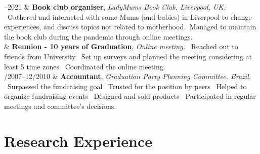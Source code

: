 \documentclass[11pt, a4paper]{article}
\newcommand{\Duration}[2]{\fontsize{10pt}{0}\selectfont #1--#2}
\newcommand{\Year}[1]{\fontsize{10pt}{0}\selectfont #1}
\begin{document}
\begin{EntriesTable}
	\Duration{2020}{2021}  &
	\textbf{Book club organiser},
	\newline
	\textit{ LadyMums Book Club, Liverpool, UK.}
	\newline
	\textbullet \ Gathered and interacted with some Mums (and babies) in Liverpool to change
	experiences, and discuss topics not related to motherhood
	\textbullet \ Managed to maintain the book club during the pandemic through
	online meetings.
	\\
	\Year{2020}  &
	\textbf{Reunion - 10 years of Graduation},
	\newline
	\textit{ Online meeting.}
	\newline
	\textbullet \ Reached out to friends from University
	\textbullet \ Set up surveys and planned the meeting considering at least 5
	time zones
	\textbullet \ Coordinated the online meeting.
	\\
	\Duration{04/2007}{12/2010}  &
	\textbf{Accountant},
	\newline
	\textit{ Graduation Party Planning Committee, Brazil.}
	\newline
	\textbullet \ Surpassed the fundraising goal
	\textbullet \ Trusted for the position by peers
	\textbullet \ Helped to organize fundraising events
	\textbullet \ Designed and sold products
	\textbullet \ Participated in regular meetings and
	committee's decisions.

\end{EntriesTable}


\section*{Research Experience}
\end{document}
